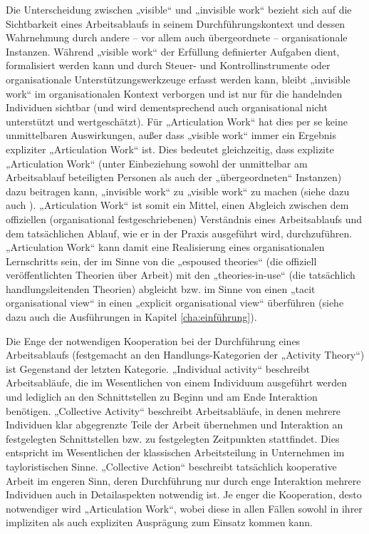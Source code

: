 Die Unterscheidung zwischen „visible“ und „invisible work“ bezieht sich auf die Sichtbarkeit eines Arbeitsablaufs in seinem Durchführungskontext und dessen Wahrnehmung durch andere -- vor allem auch übergeordnete -- organisationale Instanzen. Während „visible work“ der Erfüllung definierter Aufgaben dient, formalisiert werden kann und durch Steuer- und Kontrollinstrumente oder organisationale Unterstützungswerkzeuge erfasst werden kann, bleibt „invisible work“ im organisationalen Kontext verborgen und ist nur für die handelnden Individuen sichtbar (und wird dementsprechend auch organisational nicht unterstützt und wertgeschätzt). Für „Articulation Work“ hat dies per se keine unmittelbaren Auswirkungen, außer dass „visible work“ immer ein Ergebnis expliziter „Articulation Work“ ist. Dies bedeutet gleichzeitig, dass explizite „Articulation Work“ (unter Einbeziehung sowohl der unmittelbar am Arbeitsablauf beteiligten Personen als auch der „übergeordneten“ Instanzen) dazu beitragen kann, „invisible work“ zu „visible work“ zu machen (siehe dazu auch \citep{Fujimura87}). „Articulation Work“ ist somit ein Mittel, einen Abgleich zwischen dem offiziellen (organisational festgeschriebenen) Verständnis eines Arbeitsablaufs und dem tatsächlichen Ablauf, wie er in der Praxis ausgeführt wird, durchzuführen. „Articulation Work“ kann damit eine Realisierung eines organisationalen Lernschritts sein, der im Sinne von \citet{Argyris78} die „espoused theories“ (die offiziell veröffentlichten Theorien über Arbeit) mit den „theories-in-use“ (die tatsächlich handlungsleitenden Theorien) abgleicht bzw. im Sinne von \citet{Sachs95} einen „tacit organisational view“ in einen „explicit organisational view“ überführen (siehe dazu auch die Ausführungen in Kapitel \ref{cha:einführung}). 

Die Enge der notwendigen Kooperation bei der Durchführung eines Arbeitsablaufs (festgemacht an den Handlungs-Kategorien der „Activity Theory“) ist Gegenstand der letzten Kategorie. „Individual activity“ beschreibt Arbeitsabläufe, die im Wesentlichen von einem Individuum ausgeführt werden und lediglich an den Schnittstellen zu Beginn und am Ende Interaktion benötigen. „Collective Activity“ beschreibt Arbeitsabläufe, in denen mehrere Individuen klar abgegrenzte Teile der Arbeit übernehmen und Interaktion an festgelegten Schnittstellen bzw. zu festgelegten Zeitpunkten stattfindet. Dies entspricht im Wesentlichen der klassischen Arbeitsteilung in Unternehmen im tayloristischen Sinne. „Collective Action“ beschreibt tatsächlich kooperative Arbeit im engeren Sinn, deren Durchführung nur durch enge Interaktion mehrere Individuen auch in Detailaspekten notwendig ist. Je enger die Kooperation, desto notwendiger wird „Articulation Work“, wobei diese in allen Fällen sowohl in ihrer impliziten als auch expliziten Ausprägung zum Einsatz kommen kann. 

